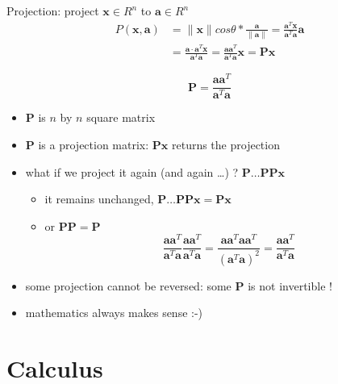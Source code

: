 \documentclass[ignorenonframetext,]{beamer}
\providecommand{\tightlist}{%
  \setlength{\itemsep}{0pt}\setlength{\parskip}{0pt}}
\newcommand{\vv}[1]{\boldsymbol{#1}}
\begin{document}
\begin{frame}{}
\protect\hypertarget{section-5}{}

Projection: project \(\vv{x}\in R^n\) to \(\vv{a}\in R^n\)
\begin{align*}P(\vv{x}, \vv{a}) &= \|\vv{x}\|cos \theta * \frac{\vv{a}}{\|\vv{a}\|} =  \frac{\vv{a}^T\vv{x}}{\vv{a}^T\vv{a}}  \vv{a} \\
&= \frac{\vv{a}\cdot \vv{a}^T\vv{x}}{\vv{a}^T\vv{a}} = \frac{\vv{a}\vv{a}^T}{\vv{a}^{T}\vv{a}}\vv{x}=\vv{Px}\end{align*}

\[\vv{P} = \frac{\vv{a}\vv{a}^T}{\vv{a}^{T}\vv{a}}\]

\begin{itemize}
\tightlist
\item
  \(\vv{P}\) is \(n\) by \(n\) square matrix
\item
  \(\vv{P}\) is a projection matrix: \(\vv{Px}\) returns the projection
\item
  what if we project it again (and again \ldots{}) ?
  \(\vv{P}\ldots\vv{P}\vv{P}\vv{x}\) \pause 

  \begin{itemize}
  \tightlist
  \item
    it remains unchanged,
    \(\vv{P}\ldots\vv{P}\vv{P}\vv{x} = \vv{P}\vv{x}\)
  \item
    or \(\vv{P}\vv{P} = \vv{P}\)
    \[\frac{\vv{a}\vv{a}^T}{\vv{a}^{T}\vv{a}}\frac{\vv{a}\vv{a}^T}{\vv{a}^{T}\vv{a}}= \frac{\vv{aa}^T\vv{aa}^T}{(\vv{a}^T\vv{a})^2}= \frac{\vv{a}\vv{a}^T}{\vv{a}^{T}\vv{a}}\]
  \end{itemize}
\item
  some projection cannot be reversed: some \(\vv{P}\) is not invertible
  !
\item
  mathematics always makes sense :-)
\end{itemize}

\section{Calculus}

\end{frame}
\end{document}
